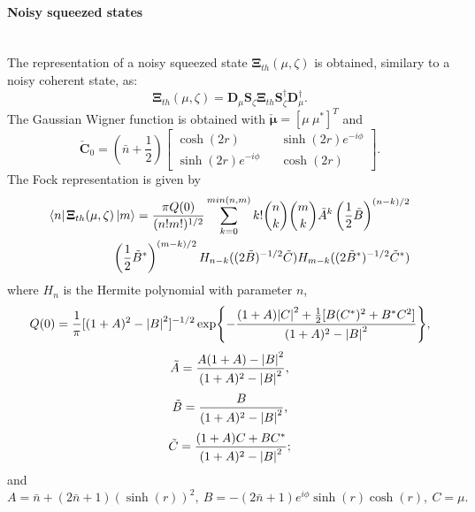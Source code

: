     \paragraph{Noisy squeezed states}\mbox{} \\
    The representation of a noisy squeezed state $\pmb{\Xi}_{th}(\mu,\zeta)$ is obtained,
    similary to a noisy coherent state, as:
    \begin{equation}
        \pmb{\Xi}_{th}(\mu,\zeta)=\pmb{D}_\mu\pmb{S}_\zeta\pmb{\Xi}_{th}
        \pmb{S}_\zeta^\dagger\pmb{D}_\mu^\dagger.
    \end{equation}
    The Gaussian Wigner function is obtained with $\check{\pmb{\mu}}=[\mu\ \mu^*]^T$ and
    \begin{equation*}
        \check{\pmb{C}}_0=\left(\bar{n}+\frac{1}{2}\right)
        \begin{bmatrix}
            \cosh(2r) && \sinh(2r)e^{-i\phi}\\
            \sinh(2r)e^{-i\phi} && \cosh(2r)
        \end{bmatrix}.
    \end{equation*}
    The Fock representation is given by \cite{MarMar_1993}
    \begin{equation}\begin{split}
        \bra{n}\pmb{\Xi}_{th}(\mu,\zeta)\ket{m}=\frac{\pi Q(0)}{(n!m!)^{1/2}}
        \sum_{k=0}^{min(n,m)} k! \binom{n}{k}\binom{m}{k} \tilde{A}^k\left(\frac{1}{2}
        \tilde{B}\right)^{(n-k)/2}\\ \left(\frac{1}{2}\tilde{B}^*\right)^{(m-k)/2}
        H_{n-k}((2\tilde{B})^{-1/2}\tilde{C}) H_{m-k}((2\tilde{B}^*)^{-1/2}\tilde{C}^*) 
        \label{FR_NSS}
    \end{split}\end{equation}
    where $H_n$ is the Hermite polynomial with parameter $n$,
    \begin{equation*}
        Q(0)=\frac{1}{\pi}[(1+A)^2-\absolutevalue{B}^2]^{-1/2}\exp{-\frac{(1+A)\absolutevalue{C}^2
        +\frac{1}{2}[B(C^*)^2+B^*C^2]}{(1+A)^2-\absolutevalue{B}^2}},
    \end{equation*} 
    \begin{equation*}
        \tilde{A}=\frac{A(1+A)-\absolutevalue{B}^2}{(1+A)^2-\absolutevalue{B}^2},
    \end{equation*}
    \begin{equation*}
        \tilde{B}=\frac{B}{(1+A)^2-\absolutevalue{B}^2},
    \end{equation*}
    \begin{equation*}
        \tilde{C}=\frac{(1+A)C+BC^*}{(1+A)^2-\absolutevalue{B}^2};
    \end{equation*}
    and
    \begin{equation*}
        A=\bar{n}+(2\bar{n}+1)(\sinh(r))^2,\ 
        B=-(2\bar{n}+1)e^{i\phi}\sinh(r)\cosh(r),\ 
        C=\mu.
    \end{equation*}

